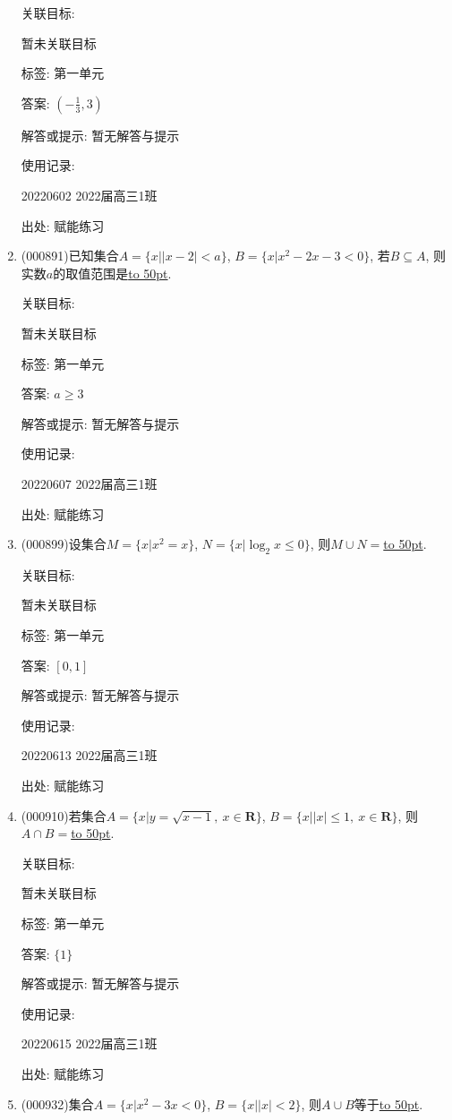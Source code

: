 \documentclass[10pt,a4paper]{article}
\newcommand{\blank}[1]{\underline{\hbox to #1pt{}}}
\begin{document}
\begin{enumerate}[1.]
关联目标:

暂未关联目标



标签: 第一单元

答案: $(-\frac 13,3)$

解答或提示: 暂无解答与提示

使用记录:

20220602	2022届高三1班	


出处: 赋能练习
\item { (000891)}已知集合$A=\{x||x-2|<a\}$, $B=\{x|x^2-2x-3<0\}$, 若$B\subseteq A$, 则实数$a$的取值范围是\blank{50}.


关联目标:

暂未关联目标



标签: 第一单元

答案: $a\ge 3$

解答或提示: 暂无解答与提示

使用记录:

20220607	2022届高三1班	


出处: 赋能练习
\item { (000899)}设集合$M=\{x|x^2=x\}$, $N=\{x|\log_2 x\le 0\}$, 则$M\cup N=$\blank{50}.


关联目标:

暂未关联目标



标签: 第一单元

答案: $[0,1]$

解答或提示: 暂无解答与提示

使用记录:

20220613	2022届高三1班	


出处: 赋能练习
\item { (000910)}若集合$A=\{x|y=\sqrt{x-1},\ x\in \mathbf{R}\}$, $B=\{x||x|\le 1,\ x\in \mathbf{R}\}$, 则$A\cap B=$\blank{50}.


关联目标:

暂未关联目标



标签: 第一单元

答案: $\{1\}$

解答或提示: 暂无解答与提示

使用记录:

20220615	2022届高三1班	


出处: 赋能练习
\item { (000932)}集合$A=\{x|x^2-3x<0\}$, $B=\{x||x|<2\}$, 则$A\cup B$等于\blank{50}.



\end{enumerate}
\end{document}
